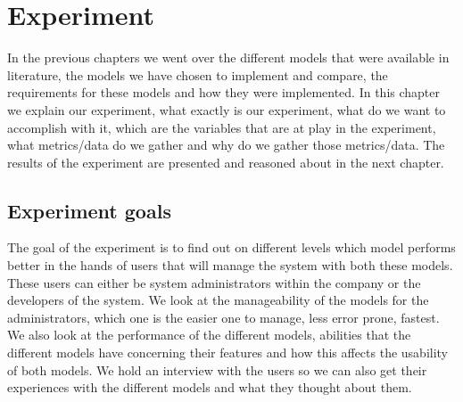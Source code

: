 \chapter{Experiment}
\label{chapt:Experiment}
In the previous chapters we went over the different models that were available in literature, the models we have chosen to implement and compare, the requirements for these models and how they were implemented.
In this chapter we explain our experiment, what exactly is our experiment, what do we want to accomplish with it, which are the variables that are at play in the experiment, what metrics/data do we gather and why do we gather those metrics/data.
The results of the experiment are presented and reasoned about in the next chapter.

\section{Experiment goals}
The goal of the experiment is to find out on different levels which model performs better in the hands of users that will manage the system with both these models.
These users can either be system administrators within the company or the developers of the system.
We look at the manageability of the models for the administrators, which one is the easier one to manage, less error prone, fastest.
We also look at the performance of the different models, abilities that the different models have concerning their features and how this affects the usability of both models.
We hold an interview with the users so we can also get their experiences with the different models and what they thought about them. 


